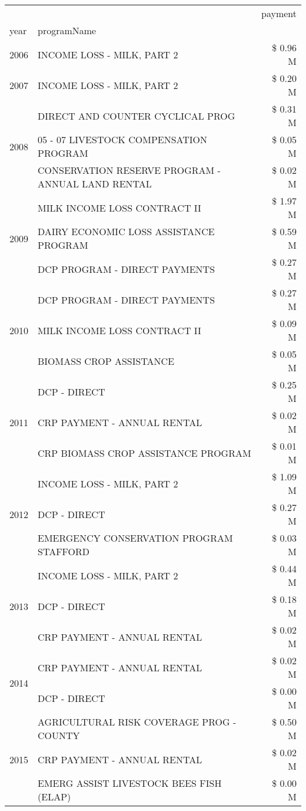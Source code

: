 \begin{tabular}{llr}
\toprule
 &  & payment \\
year & programName &  \\
\midrule
2006 & INCOME LOSS - MILK, PART 2 & \$ 0.96 M \\
\cline{1-3}
2007 & INCOME LOSS - MILK, PART 2 & \$ 0.20 M \\
\cline{1-3}
\multirow[t]{3}{*}{2008} & DIRECT AND COUNTER CYCLICAL PROG & \$ 0.31 M \\
 & 05 - 07 LIVESTOCK COMPENSATION PROGRAM & \$ 0.05 M \\
 & CONSERVATION RESERVE PROGRAM - ANNUAL LAND RENTAL & \$ 0.02 M \\
\cline{1-3}
\multirow[t]{3}{*}{2009} & MILK INCOME LOSS CONTRACT II & \$ 1.97 M \\
 & DAIRY ECONOMIC LOSS ASSISTANCE PROGRAM & \$ 0.59 M \\
 & DCP PROGRAM - DIRECT PAYMENTS & \$ 0.27 M \\
\cline{1-3}
\multirow[t]{3}{*}{2010} & DCP PROGRAM - DIRECT PAYMENTS & \$ 0.27 M \\
 & MILK INCOME LOSS CONTRACT II & \$ 0.09 M \\
 & BIOMASS CROP ASSISTANCE & \$ 0.05 M \\
\cline{1-3}
\multirow[t]{3}{*}{2011} & DCP - DIRECT & \$ 0.25 M \\
 & CRP PAYMENT - ANNUAL RENTAL & \$ 0.02 M \\
 & CRP BIOMASS CROP ASSISTANCE PROGRAM & \$ 0.01 M \\
\cline{1-3}
\multirow[t]{3}{*}{2012} & INCOME LOSS - MILK, PART 2 & \$ 1.09 M \\
 & DCP - DIRECT & \$ 0.27 M \\
 & EMERGENCY CONSERVATION PROGRAM STAFFORD & \$ 0.03 M \\
\cline{1-3}
\multirow[t]{3}{*}{2013} & INCOME LOSS - MILK, PART 2 & \$ 0.44 M \\
 & DCP - DIRECT & \$ 0.18 M \\
 & CRP PAYMENT - ANNUAL RENTAL & \$ 0.02 M \\
\cline{1-3}
\multirow[t]{2}{*}{2014} & CRP PAYMENT - ANNUAL RENTAL & \$ 0.02 M \\
 & DCP - DIRECT & \$ 0.00 M \\
\cline{1-3}
\multirow[t]{3}{*}{2015} & AGRICULTURAL RISK COVERAGE PROG - COUNTY & \$ 0.50 M \\
 & CRP PAYMENT - ANNUAL RENTAL & \$ 0.02 M \\
 & EMERG ASSIST LIVESTOCK BEES FISH (ELAP) & \$ 0.00 M \\

\end{tabular}
